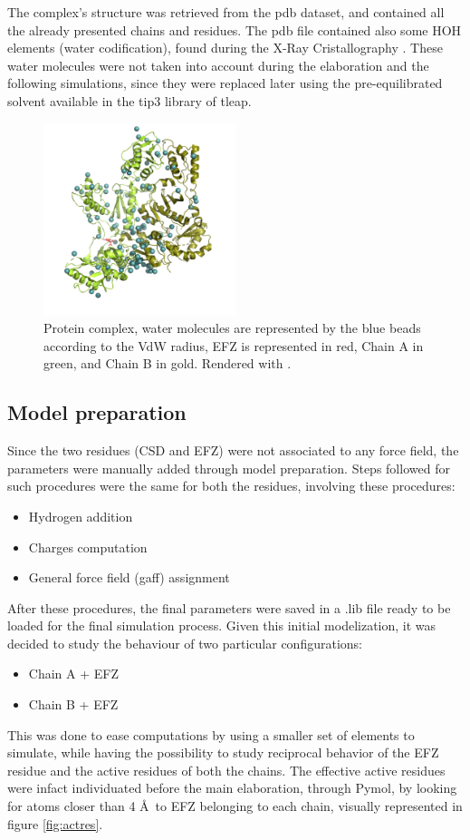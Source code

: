 \documentclass[12pt]{article}
\begin{document}
The complex's structure was retrieved from the pdb dataset, and contained all the already presented chains and residues. The pdb file contained also some HOH elements (water codification), found during the X-Ray Cristallography \cite{SAKABE1991448}.
These water molecules were not taken into account during the elaboration and the following simulations, since they were replaced later using the pre-equilibrated solvent available in the tip3 library of tleap.
\begin{figure}
    \centering
    \includegraphics[width=0.5\textwidth]{../figures/water.png}
    \caption{Protein complex, water molecules are represented by the blue beads according to the VdW radius, EFZ is represented in red, Chain A in green, and Chain B in gold. Rendered with \cite[Pymol]{pymol}. \label{fig:total}}
\end{figure}

\subsection{Model preparation}
Since the two residues (CSD and EFZ) were not associated to any force field, the parameters were manually added through model preparation.
Steps followed for such procedures were the same for both the residues, involving these procedures:

\begin{itemize}
    \item Hydrogen addition
    \item Charges computation
    \item General force field (gaff) assignment
\end{itemize}

After these procedures, the final parameters were saved in a .lib file ready to be loaded for the final simulation process.
Given this initial modelization, it was decided to study the behaviour of two particular configurations:
\begin{itemize}
    \item Chain A + EFZ
    \item Chain B + EFZ
\end{itemize}
This was done to ease computations by using a smaller set of elements to simulate, while having the possibility to study reciprocal behavior of the EFZ residue and the active residues of both the chains. The effective active residues were infact individuated before the main elaboration, through Pymol\cite{pymol}, by looking for atoms closer than 4 \AA \, to EFZ belonging to each chain, visually represented in figure \ref{fig:actres}.
\end{document}

